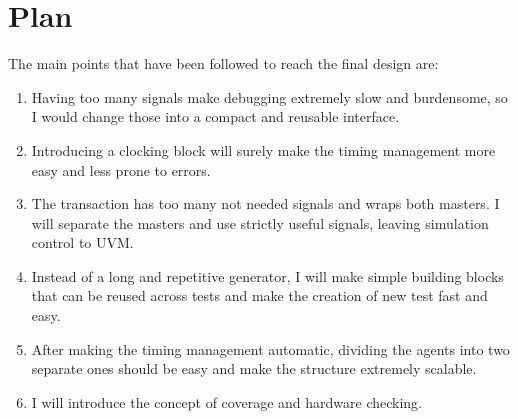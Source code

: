 \chapter{Plan} 
\label{cha:plan}

The main points that have been followed to reach the final design are:

\begin{enumerate}
    \item Having too many signals make debugging extremely slow and burdensome, so I would change those into a compact and reusable interface.
    \item Introducing a clocking block will surely make the timing management more easy and less prone to errors.
    \item The transaction has too many not needed signals and wraps both masters. I will separate the masters and use strictly useful signals, leaving simulation control to UVM.
    \item Instead of a long and repetitive generator, I will make simple building blocks that can be reused across tests and make the creation of new test fast and easy.
    \item After making the timing management automatic, dividing the agents into two separate ones should be easy and make the structure extremely scalable.
    \item I will introduce the concept of coverage and hardware checking.
\end{enumerate}